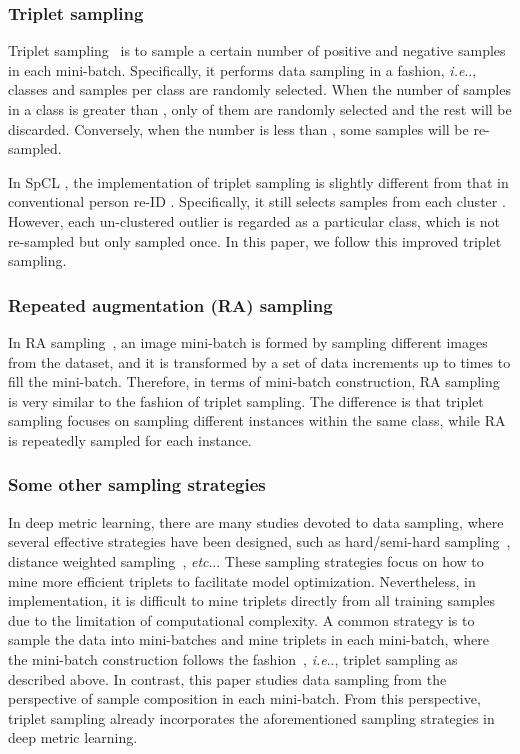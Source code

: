 \documentclass[lettersize,journal]{IEEEtran}
\makeatletter
\DeclareRobustCommand\onedot{\futurelet\@let@token\@onedot}
\def\@onedot{\ifx\@let@token.\else.\null\fi\xspace}
\def\ie{\emph{i.e}\onedot} \def\Ie{\emph{I.e}\onedot}
\def\etc{\emph{etc}\onedot} \def\vs{\emph{vs}\onedot}
\makeatother
\begin{document}
\subsubsection{Triplet sampling} \label{sec:triplet-sampling}
Triplet sampling~\cite{triplet1,triplet} is to sample a certain number of positive and negative samples in each mini-batch. Specifically, it performs data sampling in a  fashion, \ie,  classes and  samples per class are randomly selected.
When the number of samples in a class is greater than , only  of them are randomly selected and the rest will be discarded. Conversely, when the number is less than , some samples will be re-sampled.

In SpCL \cite{SpCL}, the implementation of triplet sampling is slightly different from that in conventional person re-ID \cite{triplet,strongbaseline}.
Specifically, it still selects  samples from each cluster . However, each un-clustered outlier is regarded as a particular class, which is not re-sampled but only sampled once. In this paper, we follow this improved triplet sampling.

\subsubsection{Repeated augmentation (RA) sampling}
In RA sampling~\cite{ra}, an image mini-batch  is formed by sampling  different images from the dataset, and it is transformed by a set of data increments up to  times to fill the mini-batch.
Therefore, in terms of mini-batch construction, RA sampling is very similar to the  fashion of triplet sampling. The difference is that triplet sampling focuses on sampling different instances within the same class, while RA is repeatedly sampled for each instance.

\subsubsection{Some other sampling strategies}
In deep metric learning, there are many studies devoted to data sampling, where several effective strategies have been designed, such as hard/semi-hard sampling~\cite{Facenet}, distance weighted sampling~\cite{sampling1}, \etc. These sampling strategies focus on how to mine more efficient triplets to facilitate model optimization.
Nevertheless, in implementation, it is difficult to mine triplets directly from all training samples due to the limitation of computational complexity. A common strategy is to sample the data into mini-batches and mine triplets in each mini-batch, where the mini-batch construction follows the  fashion~\cite{triplet1}, \ie, triplet sampling as described above. In contrast, this paper studies data sampling from the perspective of sample composition in each mini-batch. From this perspective, triplet sampling already incorporates the aforementioned sampling strategies in deep metric learning.
\end{document}
